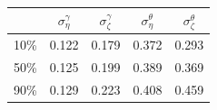 \begin{tabular}{ccccc}
\hline
 & $\sigma_{\eta}^{\gamma}$ & $\sigma_{\zeta}^{\gamma}$ & $\sigma_{\eta}^{\theta}$ & $\sigma_{\zeta}^{\theta}$ \\
\hline
10\% & 0.122 & 0.179 & 0.372 & 0.293 \\
50\% & 0.125 & 0.199 & 0.389 & 0.369 \\
90\% & 0.129 & 0.223 & 0.408 & 0.459 \\
\hline
\end{tabular}
